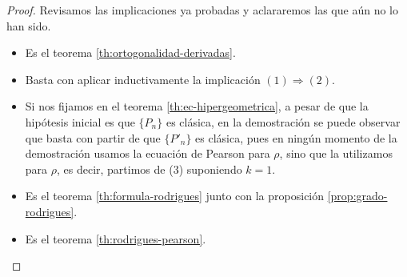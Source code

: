 \begin{proof}
    
    Revisamos las implicaciones ya probadas y aclararemos las que aún no lo han sido.
    \begin{itemize}
        \item[\fbox{$(1)\Rightarrow (2)$}] Es el teorema \ref{th:ortogonalidad-derivadas}.

        \item[\fbox{$(2)\Rightarrow (3)$}] Basta con aplicar inductivamente la implicación $(1)\Rightarrow (2)$.
        \item[\fbox{$(3)\Rightarrow (4)$}] Si nos fijamos en el teorema \ref{th:ec-hipergeometrica}, a pesar de que la hipótesis inicial es que $\{P_n\}$ es clásica, en la demostración se puede observar que basta con partir de que $\{P'_n\}$ es clásica, pues en ningún momento de la demostración usamos la ecuación de Pearson para $\rho$, sino que la utilizamos para $\rho$, es decir, partimos de (3) suponiendo $k=1$.
        \item[\fbox{$(4)\Rightarrow (5)$}] Es el teorema \ref{th:formula-rodrigues} junto con la proposición \ref{prop:grado-rodrigues}.
        \item[\fbox{$(5)\Rightarrow (1)$}] Es el teorema \ref{th:rodrigues-pearson}.
         
    \end{itemize}
\end{proof}

